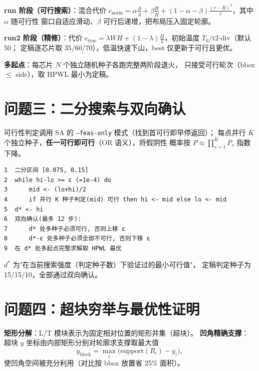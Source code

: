 \documentclass[12pt,a4paper]{article}
\begin{document}
\textbf{run 阶段（可行搜索）}：混合代价
$c_{\text{norm}} = \alpha \frac{A}{\bar A} + \beta \frac{H}{\bar H}
+ (1-\alpha-\beta)\frac{(r-R)^2}{\bar r}$，其中 $\alpha$ 随可行性
窗口自适应滑动、$\beta$ 可行后递增，把布局压入固定轮廓。

\textbf{run2 阶段（精修）}：代价 $c_{\text{true}} = \lambda WH
+ (1-\lambda)\frac{H}{2}$，初始温度 $T_0/\text{t2-div}$（默认 50；
定稿逐芯片取 35/60/70），低温快速下山，best 仅更新于可行且更优。

\textbf{多起点}：每芯片 $N$ 个独立随机种子各跑完整两阶段退火，
只接受可行轮次（bbox $\le$ side），取 HPWL 最小为定稿。

\section{问题三：二分搜索与双向确认}

可行性判定调用 SA 的 \texttt{--feas-only} 模式（找到首可行即早停返回）；
每点并行 $K$ 个独立种子，\textbf{任一可行即可行}（OR 语义），将假阴性
概率按 $P \approx \prod_{s=1}^{K} P_s$ 指数下降。

\begin{tcolorbox}[colback=blue!5, colframe=blue!50, title=算法 2：最小可行死区比例]
{\small
\begin{verbatim}
1  二分区间 [0.075, 0.15]
2  while hi-lo >= ε (=1e-4) do
3      mid <- (lo+hi)/2
4      if 并行 K 种子判定(mid) 可行 then hi <- mid else lo <- mid
5  d* <- hi
6  双向确认(最多 12 步):
7      d* 处多种子必须可行, 否则上移 ε
8      d*-ε 处多种子必须全部不可行, 否则下移 ε
9  在 d* 处多起点完整求解取 HPWL 最优
\end{verbatim}
}
\end{tcolorbox}

$d^*$ 为"在当前搜索强度（判定种子数）下验证过的最小可行值"，
定稿判定种子为 15/15/10，全部通过双向确认。

\section{问题四：超块穷举与最优性证明}

\textbf{矩形分解}：L/T 模块表示为固定相对位置的矩形并集（超块）。
\textbf{凹角精确支撑}：超块 $y$ 坐标由内部矩形分别对轮廓求支撑取最大值
\begin{equation}
y_{\text{block}} = \max_i \big( \text{support}(R_i) - y_i \big),
\end{equation}
使凹角空间被充分利用（对比按 bbox 放置省 25\% 面积）。
\end{document}
